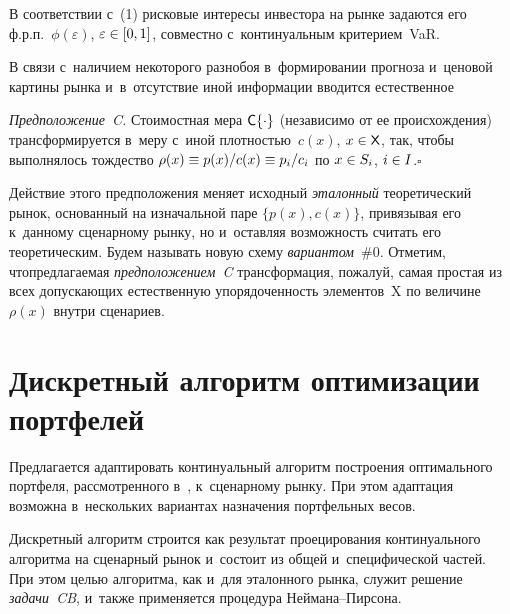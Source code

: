\begin{multicols}{2}
  В соответствии с~(1) рисковые интересы ин\-вес\-то\-ра на рынке задаются его 
ф.р.п.~$\phi(\varepsilon)$, $\varepsilon\hm\in [0, 1]$, совместно с~континуальным 
критерием~VaR. 
  
  В связи с~наличием некоторого разнобоя в~формировании прогноза и~ценовой 
картины рынка и~в~отсутствие иной информации вводится естественное
  
  \noindent
  \textit{Предположение~C.} Стоимостная мера ${\sf C}\{\cdot\}$ (независимо 
от ее происхождения) трансформируется в~меру с~иной плотностью~$c(x)$, 
$x\hm\in{\sf X}$, так, чтобы выполнялось тождество $\rho(x)\hm\equiv 
p(x)/c(x)\hm\equiv p_i/c_i$ по $x\hm\in S_i$, $i\hm\in I$.\hfill $\square$
  
  Действие этого предположения меняет исходный \textit{эталонный} 
теоретический рынок, основанный на изначальной паре $\{p(x), c(x)\}$, 
привязывая его к~данному сценарному рынку, но и~оставляя возможность 
считать его теоретическим. Будем назы\-вать новую схему 
\textit{вариантом}~\#0. Отметим, что\linebreak предлагаемая \textit{предположением~C} 
трансформация, пожалуй, самая простая из всех допускающих естественную 
упорядоченность элементов~{\sf X} по величине~$\rho(x)$ внутри сценариев. 
   
  \section{Дискретный алгоритм оптимизации портфелей}
  
  Предлагается адаптировать континуальный алгоритм построения 
оптимального портфеля, рассмотренного в~\cite{5-ag}, к~сценарному рынку. 
При этом адаптация возможна в~нескольких вариантах назначения 
портфельных весов. 
  
  Дискретный алгоритм строится как результат проецирования континуального 
алгоритма на сценарный рынок и~состоит из общей и~специфической частей. 
При этом целью алгоритма, как и~для эталонного рынка, служит решение 
\textit{задачи~CB}, и~также применяется процедура Ней\-ма\-на--Пир\-сона.
  

\end{multicols}
